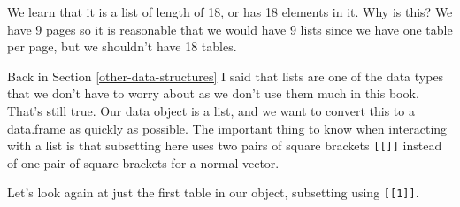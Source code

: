 \documentclass[
]{krantz}
\begin{document}
We learn that it is a list of length of 18, or has 18
elements in it. Why is this? We have 9 pages so it is
reasonable that we would have 9 lists since we have one
table per page, but we shouldn't have 18 tables.

Back in Section \ref{other-data-structures} I said that
lists are one of the data types that we don't have to worry
about as we don't use them much in this book. That's still
true. Our data object is a list, and we want to convert this
to a data.frame as quickly as possible. The important thing
to know when interacting with a list is that subsetting here
uses two pairs of square brackets \texttt{{[}{[}{]}{]}}
instead of one pair of square brackets for a normal vector.

Let's look again at just the first table in our object,
subsetting using \texttt{{[}{[}1{]}{]}}.
\end{document}
